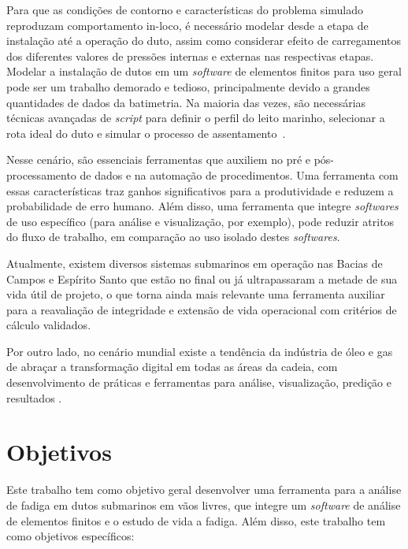 Para que as condições de contorno e características do problema simulado reproduzam comportamento in-loco, é necessário modelar desde a etapa de instalação até a operação do duto, assim como considerar efeito de carregamentos dos diferentes valores de pressões internas e externas nas respectivas etapas.
Modelar a instalação de dutos em um \textit{software} de elementos finitos para uso geral pode ser um trabalho demorado e tedioso, principalmente devido a grandes quantidades de dados da batimetria.
Na maioria das vezes, são necessárias técnicas avançadas de \textit{script} para definir o perfil do leito marinho, selecionar a rota ideal do duto e simular o processo de assentamento~\cite{VandenAbeele2013}.

Nesse cenário, são essenciais ferramentas que auxiliem no pré e pós-processamento de dados e na automação de procedimentos.
Uma ferramenta com essas características traz ganhos significativos para a produtividade e reduzem a probabilidade de erro humano.
Além disso, uma ferramenta que integre \textit{softwares} de uso específico (para análise e visualização, por exemplo), pode reduzir atritos do fluxo de trabalho, em comparação ao uso isolado destes \textit{softwares}.

Atualmente, existem diversos sistemas submarinos em operação nas Bacias de Campos e Espírito Santo que estão no final ou já ultrapassaram a metade de sua vida útil de projeto, o que torna ainda mais relevante uma ferramenta auxiliar para a reavaliação de integridade e extensão de vida operacional com critérios de cálculo validados.

Por outro lado, no cenário mundial existe a tendência da indústria de óleo e gas de abraçar a transformação digital em todas as áreas da cadeia, com desenvolvimento de práticas e ferramentas para análise, visualização, predição e resultados \cite{Mittal2017}.

\section{Objetivos}

Este trabalho tem como objetivo geral desenvolver uma ferramenta para a análise de fadiga em dutos submarinos em vãos livres,
que integre um \textit{software} de análise de elementos finitos e o estudo de vida a fadiga.
Além disso, este trabalho tem como objetivos específicos:


